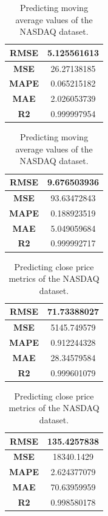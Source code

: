 \begin{table}[H]
	\centering
	\begin{minipage}{0.4\textwidth}
		\centering
		\begin{tabular}{|c|c|}
			\hline
			\textbf{RMSE} & 5.125561613 \\
			\hline
			\textbf{MSE}  & 26.27138185 \\
			\hline
			\textbf{MAPE} & 0.065215182 \\
			\hline
			\textbf{MAE}  & 2.026053739 \\
			\hline
			\textbf{R2}   & 0.999997954 \\
			\hline
		\end{tabular}
	\end{minipage}
	\begin{minipage}{0.4\textwidth}
		\centering
		\begin{tabular}{|c|c|}
			\hline
			\textbf{RMSE} & 9.676503936
			 \\
			\hline
			\textbf{MSE}  & 93.63472843
			 \\
			\hline
			\textbf{MAPE} & 0.188923519
			 \\
			\hline
			\textbf{MAE}  & 5.049059684
			 \\
			\hline
			\textbf{R2}   & 0.999992717
			 \\
			\hline
		\end{tabular}
	\end{minipage}
	\caption{Predicting moving average values of the NASDAQ dataset.}
	\label{nas:lstm_rnn_mva}
\end{table}
\begin{table}[H]
	\centering
	\begin{minipage}{0.4\textwidth}
		\centering
		\begin{tabular}{|c|c|}
			\hline
			\textbf{RMSE} & 71.73388027 \\
			\hline
			\textbf{MSE}  & 5145.749579 \\
			\hline
			\textbf{MAPE} & 0.912244328 \\
			\hline
			\textbf{MAE}  & 28.34579584 \\
			\hline
			\textbf{R2}   & 0.999601079 \\
			\hline
		\end{tabular}
	\end{minipage}
	\begin{minipage}{0.4\textwidth}
		\centering
		\begin{tabular}{|c|c|}
			\hline
			\textbf{RMSE} & 135.4257838
			 \\
			\hline
			\textbf{MSE}  & 18340.1429
			 \\
			\hline
			\textbf{MAPE} & 2.624377079
			 \\
			\hline
			\textbf{MAE}  & 70.63959959
			 \\
			\hline
			\textbf{R2}   & 0.998580178
			 \\
			\hline
		\end{tabular}
	\end{minipage}
	\caption{Predicting close price metrics of the NASDAQ dataset.}
	\label{nas:lstm_rnn_close}
\end{table}
